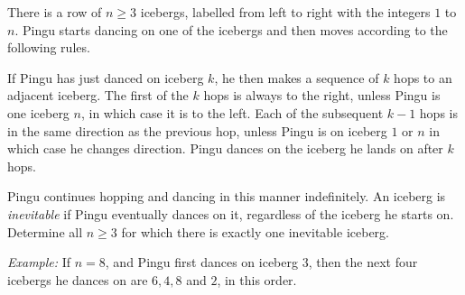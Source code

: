There is a row of $n \geq 3$ icebergs, labelled from left to right with the integers $1$ to $n$.
Pingu starts dancing on one of the icebergs and then moves according to the following rules.

If Pingu has just danced on iceberg $k$,
he then makes a sequence of $k$ hops to an adjacent iceberg.
The first of the $k$ hops is always to the right, unless Pingu is one iceberg $n$,
in which case it is to the left.
Each of the subsequent $k-1$ hops is in the same direction as the previous hop,
unless Pingu is on iceberg $1$ or $n$ in which case he changes direction.
Pingu dances on the iceberg he lands on after $k$ hops.

Pingu continues hopping and dancing in this manner indefinitely.
An iceberg is \emph{inevitable} if Pingu eventually dances on it,
regardless of the iceberg he starts on.
Determine all $n \ge 3$ for which there is exactly one inevitable iceberg.

\emph{Example:} If $n = 8$, and Pingu first dances on iceberg $3$,
then the next four icebergs he dances on are $6, 4, 8$ and $2$, in this order.
